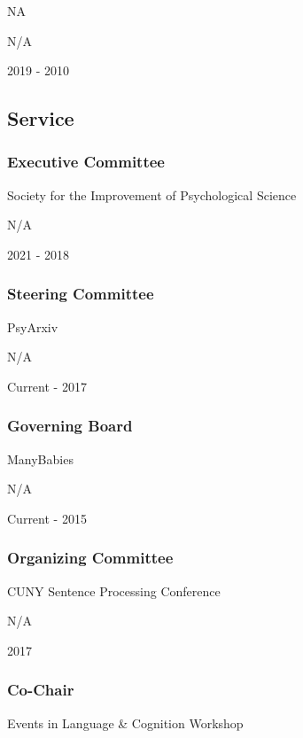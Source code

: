 \documentclass[
]{article}
\begin{document}
NA

N/A

2019 - 2010

\hypertarget{service}{%
\subsection{Service}\label{service}}

\hypertarget{executive-committee}{%
\subsubsection{Executive Committee}\label{executive-committee}}

Society for the Improvement of Psychological Science

N/A

2021 - 2018

\hypertarget{steering-committee}{%
\subsubsection{Steering Committee}\label{steering-committee}}

PsyArxiv

N/A

Current - 2017

\hypertarget{governing-board}{%
\subsubsection{Governing Board}\label{governing-board}}

ManyBabies

N/A

Current - 2015

\hypertarget{organizing-committee}{%
\subsubsection{Organizing Committee}\label{organizing-committee}}

CUNY Sentence Processing Conference

N/A

2017

\hypertarget{co-chair}{%
\subsubsection{Co-Chair}\label{co-chair}}

Events in Language \& Cognition Workshop
\end{document}
